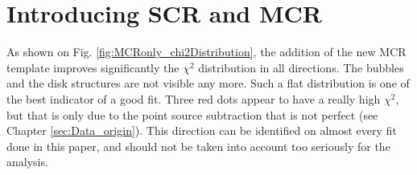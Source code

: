 \section{Introducing SCR and MCR}


As shown on Fig. \ref{fig:MCRonly_chi2Distribution}, the addition of the new MCR template improves significantly the $\chi^2$ distribution in all directions. The bubbles and the disk structures are not visible any more. Such a flat distribution is one of the best indicator of a good fit.
Three red dots appear to have a really high $\chi^2$, but that is only due to the point source subtraction that is not perfect (see Chapter \ref{sec:Data_origin}). This direction can be identified on almost every fit done in this paper, and should not be taken into account too seriously for the analysis.


